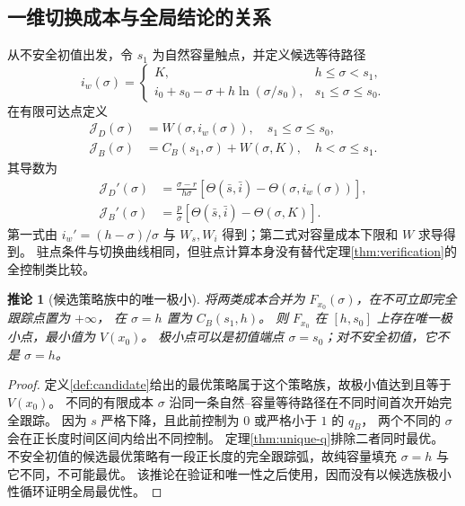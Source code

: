 \documentclass[11pt,a4paper,UTF8]{ctexart}
\newtheorem{corollary}[theorem]{推论}
\theoremstyle{definition}
\begin{document}
\subsection{一维切换成本与全局结论的关系}
从不安全初值出发，令 $s_1$ 为自然容量触点，并定义候选等待路径
\[
i_w(\sigma)=
\begin{cases}
K,&h\le\sigma<s_1,\\
i_0+s_0-\sigma+h\ln(\sigma/s_0),&s_1\le\sigma\le s_0.
\end{cases}
\]
在有限可达点定义
\begin{align}
\mathcal J_D(\sigma)&=W(\sigma,i_w(\sigma)),\quad s_1\le\sigma\le s_0,
\label{eq:JD}\\
\mathcal J_B(\sigma)&=C_B(s_1,\sigma)+W(\sigma,K),\quad h<\sigma\le s_1.
\label{eq:JB}
\end{align}
其导数为
\begin{align}
\mathcal J_D'(\sigma)&=\frac{\sigma-r}{h\sigma}
[\Theta(\bar s,\bar i)-\Theta(\sigma,i_w(\sigma))],\label{eq:JD-derivative}\\
\mathcal J_B'(\sigma)&=\frac p\sigma
[\Theta(\bar s,\bar i)-\Theta(\sigma,K)].\label{eq:JB-derivative}
\end{align}
第一式由 $i_w'=(h-\sigma)/\sigma$ 与 $W_s,W_i$ 得到；第二式对容量成本下限和 $W$ 求导得到。
驻点条件与切换曲线相同，但驻点计算本身没有替代定理\ref{thm:verification}的全控制类比较。

\begin{corollary}[候选策略族中的唯一极小]
\label{cor:one-dimensional-min}
将两类成本合并为 $F_{x_0}(\sigma)$，在不可立即完全跟踪点置为 $+\infty$，
在 $\sigma=h$ 置为 $C_B(s_1,h)$。
则 $F_{x_0}$ 在 $[h,s_0]$ 上存在唯一极小点，最小值为 $V(x_0)$。
极小点可以是初值端点 $\sigma=s_0$；对不安全初值，它不是 $\sigma=h$。
\end{corollary}
\begin{proof}
定义\ref{def:candidate}给出的最优策略属于这个策略族，故极小值达到且等于 $V(x_0)$。
不同的有限成本 $\sigma$ 沿同一条自然--容量等待路径在不同时间首次开始完全跟踪。
因为 $s$ 严格下降，且此前控制为 $0$ 或严格小于 $1$ 的 $q_B$，
两个不同的 $\sigma$ 会在正长度时间区间内给出不同控制。
定理\ref{thm:unique-q}排除二者同时最优。
不安全初值的候选最优策略有一段正长度的完全跟踪弧，故纯容量填充 $\sigma=h$ 与它不同，不可能最优。
该推论在验证和唯一性之后使用，因而没有以候选族极小性循环证明全局最优性。
\end{proof}
\end{document}
